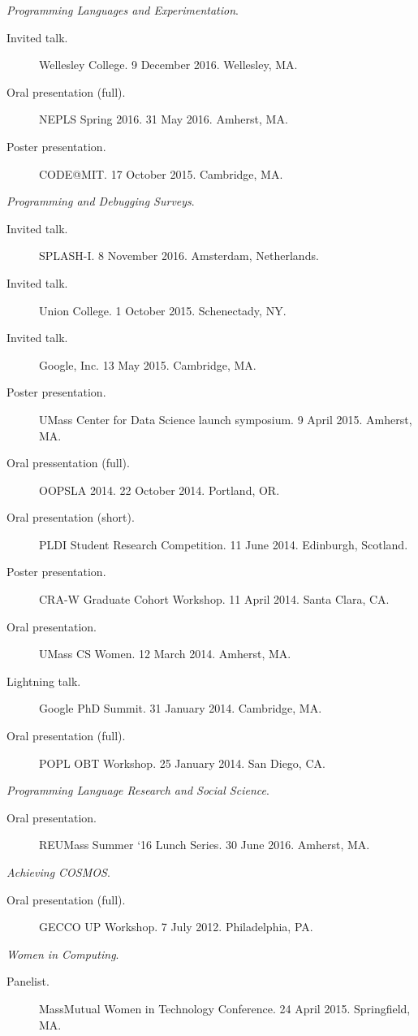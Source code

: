 \documentclass[10pt]{article}
\newcommand{\cvsec}[2]{
    \begin{tcolorbox}[width=\textwidth, breakable, title={#1}]
        #2
    \end{tcolorbox}
    \vspace{10pt}
}
\begin{document}
\cvsec{Talks and Presentations}{
  \emph{Programming Languages and Experimentation}.
    \begin{description}
      \item[Invited talk.] Wellesley College. 9 December 2016. Wellesley, MA.
      \item[Oral presentation (full).] NEPLS Spring 2016. 31 May 2016. Amherst, MA.
      \item[Poster presentation.] CODE@MIT. 17 October 2015. Cambridge, MA.
    \end{description}
    \vspace{10pt}
    \emph{Programming and Debugging Surveys}.
    \begin{description}
      \item[Invited talk.] SPLASH-I. 8 November 2016. Amsterdam, Netherlands.
      \item[Invited talk.] Union College. 1 October 2015. Schenectady, NY.
      \item[Invited talk.] Google, Inc. 13 May 2015. Cambridge, MA.
      \item[Poster presentation.] UMass Center for Data Science launch symposium. 9 April 2015. Amherst, MA.
      \item[Oral pressentation (full).] OOPSLA 2014. 22 October 2014. Portland, OR.
      \item[Oral presentation (short).] PLDI Student Research Competition. 11 June 2014. Edinburgh, Scotland.
      \item[Poster presentation.] CRA-W Graduate Cohort Workshop. 11 April 2014. Santa Clara, CA.
      \item[Oral presentation.] UMass CS Women. 12 March 2014. Amherst, MA.
      \item[Lightning talk.] Google PhD Summit. 31 January 2014. Cambridge, MA.
      \item[Oral presentation (full).]  POPL OBT Workshop. 25 January 2014. San Diego, CA.
    \end{description}
    \vspace{10pt}
    \emph{Programming Language Research and Social Science}.
    \begin{description}
      \item[Oral presentation.] REUMass Summer `16 Lunch Series. 30 June 2016.  Amherst, MA.
    \end{description}
    \vspace{10pt}
    \emph{Achieving COSMOS}.
    \begin{description}
    \item[Oral presentation (full).]  GECCO UP Workshop. 7 July 2012. Philadelphia, PA.
    \end{description}
    \vspace{10pt}
    \emph{Women in Computing}.
    \begin{description}
    \item[Panelist.]  MassMutual Women in Technology Conference. 24 April 2015. Springfield, MA.
    \end{description}
}
\end{document}
